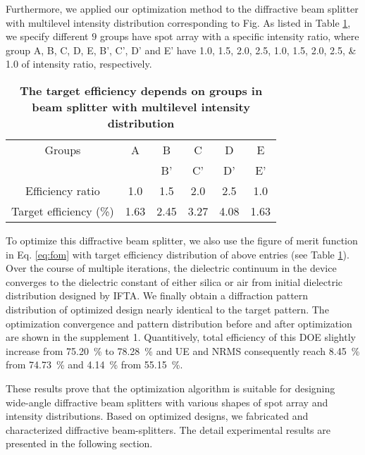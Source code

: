 Furthermore, we applied our optimization method to the diffractive beam splitter with multilevel intensity distribution corresponding to Fig. 
As listed in Table \ref{tab:targetratio}, we specify different $9$ groups have spot array with a specific intensity ratio, where group A, B, C, D, E, B', C', D' and E' have \numlist{1.0;1.5;2.0;2.5;1.0;1.5;2.0;2.5;1.0} of intensity ratio, respectively.
\begin{table}[htbp]
\centering
\caption{\bf The target efficiency depends on groups in beam splitter with multilevel intensity distribution}
\begin{tabular}{cccccc}
\hline
Groups & A & B & C & D & E   \\
& &  B' & C' & D' & E' \\
\hline
Efficiency ratio & 1.0 & 1.5 & 2.0 & 2.5 & 1.0 \\
Target efficiency (\%) & 1.63 & 2.45 & 3.27 & 4.08 & 1.63 \\
\hline
\end{tabular}
  \label{tab:targetratio}
\end{table}
To optimize this diffractive beam splitter, we also use the figure of merit function in Eq. \ref{eq:fom} with target efficiency distribution of above entries (see Table \ref{tab:targetratio}). 
Over the course of multiple iterations, the dielectric continuum in the device converges to the dielectric constant of either silica or air from initial dielectric distribution designed by IFTA.
We finally obtain a diffraction pattern distribution of optimized design nearly identical to the target pattern. The optimization convergence and pattern distribution before and after optimization are shown in the supplement 1.
Quantitively, total efficiency of this DOE slightly increase from \SI{75.20}{\percent} to \SI{78.28}{\percent} and UE and NRMS consequently reach \SI{8.45}{\percent} from \SI{74.73}{\percent} and \SI{4.14}{\percent} from \SI{55.15}{\percent}.

These results prove that the optimization algorithm is suitable for designing wide-angle diffractive beam splitters with various shapes of spot array and intensity distributions.
Based on optimized designs, we fabricated and characterized diffractive beam-splitters. 
The detail experimental results are presented in the following section.

